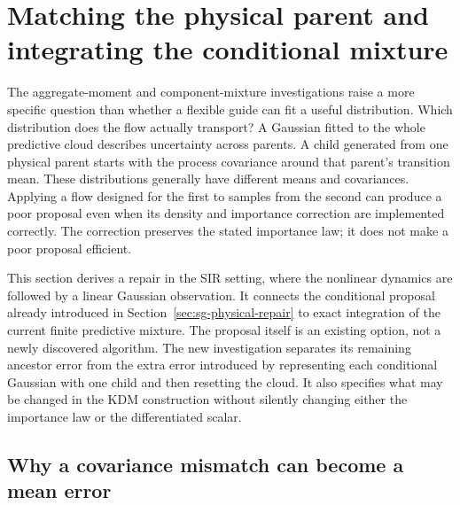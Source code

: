 \section{Matching the physical parent and integrating the conditional mixture}
\label{sec:parent-conditioned-repair}

The aggregate-moment and component-mixture investigations raise a more specific
question than whether a flexible guide can fit a useful distribution. Which
distribution does the flow actually transport? A Gaussian fitted to the whole
predictive cloud describes uncertainty across parents. A child generated from
one physical parent starts with the process covariance around that parent's
transition mean. These distributions generally have different means and
covariances. Applying a flow designed for the first to samples from the second
can produce a poor proposal even when its density and importance correction are
implemented correctly. The correction preserves the stated importance law;
it does not make a poor proposal efficient.

This section derives a repair in the SIR setting, where the nonlinear dynamics
are followed by a linear Gaussian observation. It connects the conditional
proposal already introduced in Section~\ref{sec:sg-physical-repair} to exact
integration of the current finite predictive mixture. The proposal itself is
an existing option, not a newly discovered algorithm. The new investigation
separates its remaining ancestor error from the extra error introduced by
representing each conditional Gaussian with one child and then resetting the
cloud. It also specifies what may be changed in the KDM construction without
silently changing either the importance law or the differentiated scalar.

\subsection{Why a covariance mismatch can become a mean error}

